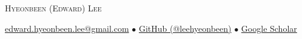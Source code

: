 \documentclass[a4paper,10pt]{extarticle}
\begin{document}
\renewcommand*{\arraystretch}{1.5}

\pagestyle{empty}

\begin{center}
	{\huge \textsc{Hyeonbeen (Edward) Lee}}
\end{center}

\begin{center}
	\href{mailto:edward.hyeonbeen.lee@gmail.com}{edward.hyeonbeen.lee@gmail.com} $\bullet$ \href{https://github.com/leehyeonbeen}{GitHub (@leehyeonbeen)} $\bullet$ \href{https://scholar.google.com/citations?user=TiduRxoAAAAJ}{Google Scholar}
\end{center}



\end{document}
